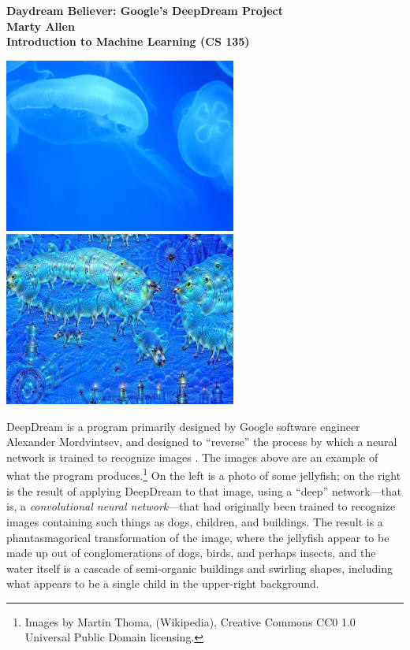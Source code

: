 \documentclass[leqno,12pt]{article}
\begin{document}
\begin{center}
\singlespacing
{\bf 
	Daydream Believer: Google's DeepDream Project\\
	Marty Allen \\
	Introduction to Machine Learning (CS 135)
}

\vspace{18pt}
\includegraphics[width=3in]{fish} \vspace*{.5in}
\includegraphics[width=3in]{deepDreamFish}
\end{center}

\vspace{-0.5in}

\doublespacing
\noindent 
DeepDream is a program primarily designed by Google software engineer Alexander Mordvintsev, and designed to
``reverse'' the process by which a neural network is trained to recognize images \cite{deepdreamsite}.
The images above are an example of what the program produces.\footnote{Images by Martin Thoma, 
(Wikipedia), Creative Commons CC0 1.0 Universal Public Domain licensing.}  On the left is a photo of some
jellyfish;  on the right is the result of applying DeepDream to that image, using a ``deep'' network---that is,
a \emph{convolutional neural network}---that had originally been trained to recognize images containing such
things as dogs, children, and buildings.  The result is a phantasmagorical transformation of the image, where the
jellyfish appear to be made up out of conglomerations of dogs, birds, and perhaps insects, and the water itself
is a cascade of semi-organic buildings and swirling shapes, including what appears to be a single child in the
upper-right background.
\end{document}
